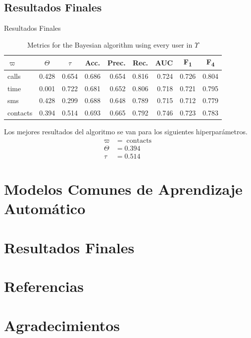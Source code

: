 \documentclass{beamer}
\DeclareMathOperator{\contacts}{contacts}
\newcommand{\ct}[1]{\multicolumn{1}{c}{#1}}
\begin{document}
\subsection{Resultados Finales}

\begin{frame}{Resultados Finales}
	\begin{table}
		\begin{tabular}{l r r r r r r r r}
			\toprule
			$\varpi$ & \ct{$\Theta$} & \ct{$\tau$} & \ct{Acc.} & \ct{Prec.} & \ct{Rec.} & \ct{AUC} & \ct{F\textsubscript{1}} & \ct{F\textsubscript{4}} \\
			\midrule
			calls    & 0.428 & 0.654 & 0.686 & 0.654 & 0.816 & 0.724 & 0.726 & 0.804 \\
			time     & 0.001 & 0.722 & 0.681 & 0.652 & 0.806 & 0.718 & 0.721 & 0.795 \\
			sms      & 0.428 & 0.299 & 0.688 & 0.648 & 0.789 & 0.715 & 0.712 & 0.779 \\
			contacts & 0.394 & 0.514 & 0.693 & 0.665 & 0.792 & 0.746 & 0.723 & 0.783 \\
			\bottomrule
		\end{tabular}
		\caption{Metrics for the Bayesian algorithm using every user in $\Upsilon$}
	\end{table}

	\pause{}
	Los mejores resultados del algoritmo se van para los siguientes hiperparámetros.
	\begin{align*}
		\varpi &= \contacts \\
		\Theta &= 0.394 \\
		\tau &= 0.514
	\end{align*}
\end{frame}

\section{Modelos Comunes de Aprendizaje Automático}

\begin{frame}
	
\end{frame}

\section{Resultados Finales}

\begin{frame}
	
\end{frame}

\section{Referencias}

\section{Agradecimientos}

\begin{frame}
	
\end{frame}
\end{document}
